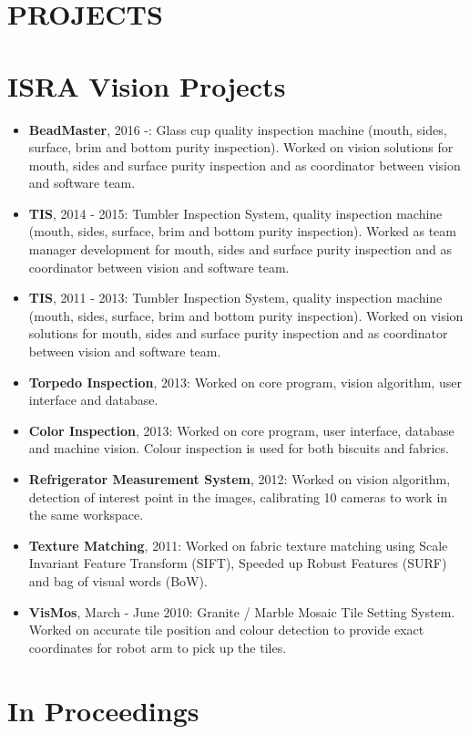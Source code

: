 \documentclass[margin]{res}
\begin{document}
\begin{resume}
		\section{PROJECTS} 
		\normalsize{\section{ISRA Vision Projects}}
		\begin{itemize} \itemsep -2pt %
			\item[] {\bf BeadMaster}, 2016 -: Glass cup quality inspection machine (mouth, sides, surface, brim and bottom purity inspection). Worked on vision solutions for mouth, sides and surface purity inspection and as coordinator between vision and software team.
			\item[] {\bf TIS}, 2014 - 2015: Tumbler Inspection System, quality inspection machine (mouth, sides, surface, brim and bottom purity inspection). Worked as team manager development for mouth, sides and surface purity inspection and as coordinator between vision and software team.
			\item[] {\bf TIS}, 2011 - 2013: Tumbler Inspection System, quality inspection machine (mouth, sides, surface, brim and bottom purity inspection). Worked on vision solutions for mouth, sides and surface purity inspection and as coordinator between vision and software team.
			\item[] {\bf Torpedo Inspection}, 2013: Worked on core program, vision algorithm, user interface and database.
			\item[] {\bf Color Inspection}, 2013: Worked on core program, user interface, database and machine vision. Colour inspection is used for both biscuits and fabrics.
			\item[] {\bf Refrigerator Measurement System}, 2012: Worked on vision algorithm, detection of interest point in the images, calibrating 10 cameras to work in the same workspace.
			\item[] {\bf Texture Matching}, 2011: Worked on fabric texture matching using Scale Invariant Feature Transform (SIFT), Speeded up Robust Features (SURF) and bag of visual words (BoW).
			\item[] {\bf VisMos}, March - June 2010: Granite / Marble Mosaic Tile Setting System. Worked on accurate tile position and colour detection to provide exact coordinates for robot arm to pick up the tiles.
		\end{itemize}
		\normalsize{\section{In Proceedings}}

\end{resume}
\end{document}
